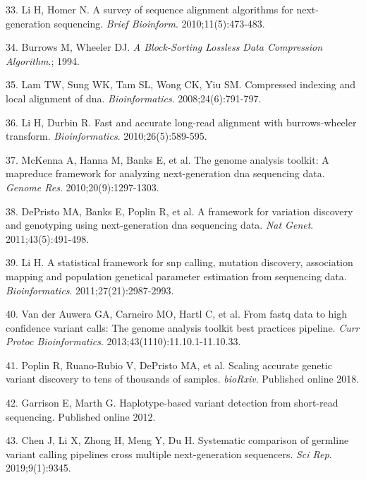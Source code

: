 \documentclass[11pt,letterpaper]{book}
\begin{document}
\leavevmode\hypertarget{ref-li:2010aa}{}%
33. Li H, Homer N. A survey of sequence alignment algorithms for next-generation sequencing. \emph{Brief Bioinform}. 2010;11(5):473-483.

\leavevmode\hypertarget{ref-burrows:1994aa}{}%
34. Burrows M, Wheeler DJ. \emph{A Block-Sorting Lossless Data Compression Algorithm}.; 1994.

\leavevmode\hypertarget{ref-lam:2008aa}{}%
35. Lam TW, Sung WK, Tam SL, Wong CK, Yiu SM. Compressed indexing and local alignment of dna. \emph{Bioinformatics}. 2008;24(6):791-797.

\leavevmode\hypertarget{ref-li:2010ab}{}%
36. Li H, Durbin R. Fast and accurate long-read alignment with burrows-wheeler transform. \emph{Bioinformatics}. 2010;26(5):589-595.

\leavevmode\hypertarget{ref-mckenna:2010aa}{}%
37. McKenna A, Hanna M, Banks E, et al. The genome analysis toolkit: A mapreduce framework for analyzing next-generation dna sequencing data. \emph{Genome Res}. 2010;20(9):1297-1303.

\leavevmode\hypertarget{ref-depristo:2011aa}{}%
38. DePristo MA, Banks E, Poplin R, et al. A framework for variation discovery and genotyping using next-generation dna sequencing data. \emph{Nat Genet}. 2011;43(5):491-498.

\leavevmode\hypertarget{ref-li:2011aa}{}%
39. Li H. A statistical framework for snp calling, mutation discovery, association mapping and population genetical parameter estimation from sequencing data. \emph{Bioinformatics}. 2011;27(21):2987-2993.

\leavevmode\hypertarget{ref-van-der-auwera:2013aa}{}%
40. Van der Auwera GA, Carneiro MO, Hartl C, et al. From fastq data to high confidence variant calls: The genome analysis toolkit best practices pipeline. \emph{Curr Protoc Bioinformatics}. 2013;43(1110):11.10.1-11.10.33.

\leavevmode\hypertarget{ref-poplin:2018aa}{}%
41. Poplin R, Ruano-Rubio V, DePristo MA, et al. Scaling accurate genetic variant discovery to tens of thousands of samples. \emph{bioRxiv}. Published online 2018.

\leavevmode\hypertarget{ref-garrison:2012aa}{}%
42. Garrison E, Marth G. Haplotype-based variant detection from short-read sequencing. Published online 2012.

\leavevmode\hypertarget{ref-chen:2019aa}{}%
43. Chen J, Li X, Zhong H, Meng Y, Du H. Systematic comparison of germline variant calling pipelines cross multiple next-generation sequencers. \emph{Sci Rep}. 2019;9(1):9345.
\end{document}
